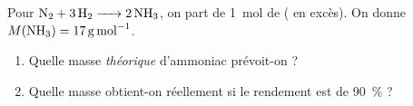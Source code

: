 \documentclass[11pt,a4paper]{article}
\begin{document}
\begin{exo}
Pour $\ce{N2 + 3 H2 -> 2 NH3}$, on part de \qty{1}{\mole} de  ( en excès). On donne
$M(\ce{NH3})=\qty{17}{\gram\per\mole}$.
\begin{enumerate}[label=\alph*)]
  \item Quelle masse \emph{théorique} d'ammoniac prévoit-on ?
  \item Quelle masse obtient-on réellement si le rendement est de \qty{90}{\percent} ?
\end{enumerate}
\end{exo}
\end{document}
